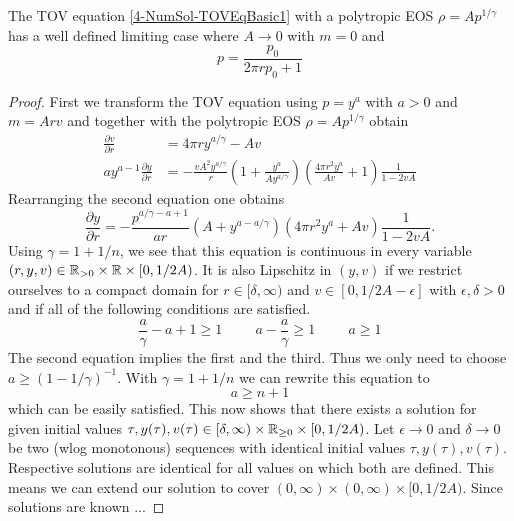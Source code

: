 \begin{theorem}
	The TOV equation \ref{4-NumSol-TOVEqBasic1} with a polytropic EOS $\rho=Ap^{1/\gamma}$ has a well defined limiting case where $A\rightarrow0$ with $m=0$ and
	\begin{equation}
		p = \frac{p_0}{2\pi rp_0+1}
	\end{equation}
\end{theorem}
\begin{proof}
	First we transform the TOV equation using $p=y^a$ with $a>0$ and $m=Arv$ and together with the polytropic EOS $\rho=Ap^{1/\gamma}$ obtain
	\begin{align}
		\frac{\partial v}{\partial r} &= 4\pi ry^{a/\gamma}-Av\\
		ay^{a-1}\frac{\partial y}{\partial r} &= -\frac{vA^2y^{a/\gamma}}{r}\left(1+\frac{y^a}{Ay^{a/\gamma}}\right)\left(\frac{4\pi r^2y^a}{Av} +1\right)\frac{1}{1-2vA}
	\end{align}
	Rearranging the second equation one obtains
	\begin{equation}
		\frac{\partial y}{\partial r} = -\frac{p^{a/\gamma-a+1}}{ar}\left(A+y^{a-a/\gamma}\right)\left(4\pi r^2y^a +Av\right)\frac{1}{1-2vA}.
	\end{equation}
	Using $\gamma=1+1/n$, we see that this equation is continuous in every variable $(r,y,v)\in\mathbb{R}_{>0}\times\mathbb{R}\times[0,1/2A)$. It is also Lipschitz in $(y,v)$ if we restrict 
	ourselves to a compact domain for $r\in[\delta,\infty)$ and $v\in[0,1/2A-\epsilon]$ with $\epsilon, \delta>0$ and if all of the following conditions are satisfied.
	\begin{equation}
		\frac{a}{\gamma}-a+1 \geq 1 \hspace{1cm} a-\frac{a}{\gamma} \geq 1 \hspace{1cm} a \geq 1
		\label{tmp-label-1}
	\end{equation}
	The second equation implies the first and the third. Thus we only need to choose $a\geq(1-1/\gamma)^{-1}$. With $\gamma=1+1/n$ we can rewrite this equation to 
	\begin{equation}
		a\geq n+1
	\end{equation}
	which can be easily satisfied. This now shows that there exists a solution for given initial values $\tau, y(\tau), v(\tau)\in[\delta,\infty)\times\mathbb{R}_{\geq0}\times[0,1/2A)$.
	Let $\epsilon\rightarrow0$ and $\delta\rightarrow0$ be two (wlog monotonous) sequences with identical initial values $\tau, y(\tau), v(\tau)$. Respective solutions are identical for 
	all values on which both are defined. This means we can extend our solution to cover $(0,\infty)\times(0,\infty)\times[0,1/2A)$. Since solutions are known
	...
\end{proof}
